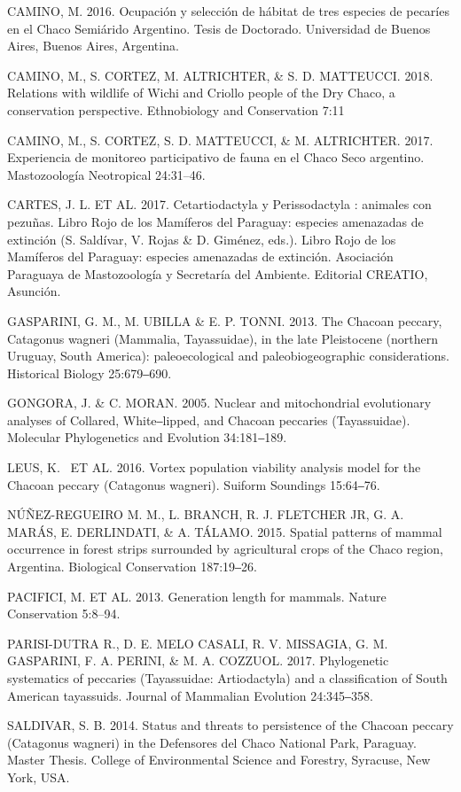 \documentclass[
  x11names]{article}
\begin{document}
CAMINO, M. 2016. Ocupación y selección de hábitat de tres especies de
pecaríes en el Chaco Semiárido Argentino. Tesis de Doctorado.
Universidad de Buenos Aires, Buenos Aires, Argentina.

CAMINO, M., S. CORTEZ, M. ALTRICHTER, \& S. D. MATTEUCCI. 2018.
Relations with wildlife of Wichi and Criollo people of the Dry Chaco, a
conservation perspective. Ethnobiology and Conservation 7:11

CAMINO, M., S. CORTEZ, S. D. MATTEUCCI, \& M. ALTRICHTER. 2017.
Experiencia de monitoreo participativo de fauna en el Chaco Seco
argentino. Mastozoología Neotropical 24:31--46.

CARTES, J. L. ET AL. 2017. Cetartiodactyla y Perissodactyla : animales
con pezuñas. Libro Rojo de los Mamíferos del Paraguay: especies
amenazadas de extinción (S. Saldívar, V. Rojas \& D. Giménez, eds.).
Libro Rojo de los Mamíferos del Paraguay: especies amenazadas de
extinción. Asociación Paraguaya de Mastozoología y Secretaría del
Ambiente. Editorial CREATIO, Asunción.

GASPARINI, G. M., M. UBILLA \& E. P. TONNI. 2013. The Chacoan peccary,
Catagonus wagneri (Mammalia, Tayassuidae), in the late Pleistocene
(northern Uruguay, South America): paleoecological and
paleobiogeographic considerations. Historical Biology 25:679‒690.

GONGORA, J. \& C. MORAN. 2005. Nuclear and mitochondrial evolutionary
analyses of Collared, White‒lipped, and Chacoan peccaries (Tayassuidae).
Molecular Phylogenetics and Evolution 34:181‒189.

LEUS, K.~ ET AL. 2016. Vortex population viability analysis model for
the Chacoan peccary (Catagonus wagneri). Suiform Soundings 15:64‒76.

NÚÑEZ-REGUEIRO M. M., L. BRANCH, R. J. FLETCHER JR, G. A. MARÁS, E.
DERLINDATI, \& A. TÁLAMO. 2015. Spatial patterns of mammal occurrence in
forest strips surrounded by agricultural crops of the Chaco region,
Argentina. Biological Conservation 187:19‒26.

PACIFICI, M. ET AL. 2013. Generation length for mammals. Nature
Conservation 5:8--94.

PARISI-DUTRA R., D. E. MELO CASALI, R. V. MISSAGIA, G. M. GASPARINI, F.
A. PERINI, \& M. A. COZZUOL. 2017. Phylogenetic systematics of peccaries
(Tayassuidae: Artiodactyla) and a classification of South American
tayassuids. Journal of Mammalian Evolution 24:345‒358.

SALDIVAR, S. B. 2014. Status and threats to persistence of the Chacoan
peccary (Catagonus wagneri) in the Defensores del Chaco National Park,
Paraguay. Master Thesis. College of Environmental Science and Forestry,
Syracuse, New York, USA.
\end{document}

